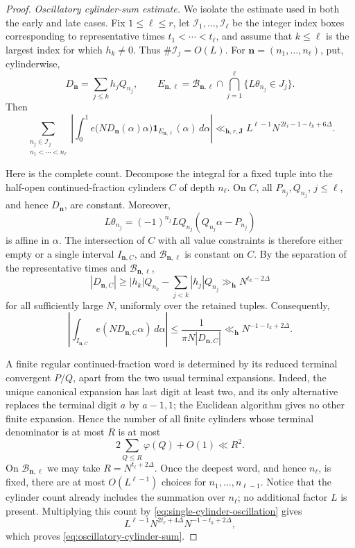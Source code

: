 \documentclass[11pt]{article}
\numberwithin{equation}{section}
\theoremstyle{definition}
\newcommand{\1}{\mathbf 1}
\begin{document}
\begin{proof}
\medskip
\noindent\emph{Oscillatory cylinder-sum estimate.}
We isolate the estimate used in both the early and late cases.  Fix
\(1\le\ell\le r\), let
\(\mathscr I_1,\ldots,\mathscr I_\ell\) be the integer index boxes
corresponding to representative times \(t_1<\cdots<t_\ell\), and
assume that \(k\le\ell\) is the largest index for which \(h_k\ne0\).
Thus \(\#\mathscr I_j=O(L)\).  For
\(\mathbf n=(n_1,\ldots,n_\ell)\), put, cylinderwise,
\[
 D_{\mathbf n}=\sum_{j\le k}h_jQ_{n_j},\qquad
 E_{\mathbf n,\ell}
 =\mathcal B_{\mathbf n,\ell}
  \cap\bigcap_{j=1}^{\ell}\{L\theta_{n_j}\in J_j\}.
\]
Then
\begin{equation}\label{eq:oscillatory-cylinder-sum}
 \sum_{\substack{n_j\in\mathscr I_j\\
                  n_1<\cdots<n_\ell}}
 \left|
  \int_0^1
   e\bigl(ND_{\mathbf n}(\alpha)\alpha\bigr)
   \1_{E_{\mathbf n,\ell}}(\alpha)\,d\alpha
 \right|
 \ll_{\mathbf h,r,\mathbf J}
 L^{\ell-1}N^{\,2t_\ell-1-t_k+6\Delta}.
\end{equation}

Here is the complete count.  Decompose the integral for a fixed tuple
into the half-open continued-fraction cylinders \(C\) of depth
\(n_\ell\).  On \(C\), all \(P_{n_j},Q_{n_j}\), \(j\le\ell\), and
hence \(D_{\mathbf n}\), are constant.  Moreover,
\[
 L\theta_{n_j}
 =(-1)^{n_j}LQ_{n_j}(Q_{n_j}\alpha-P_{n_j})
\]
is affine in \(\alpha\).  The intersection of \(C\) with all value
constraints is therefore either empty or a single interval
\(I_{\mathbf n,C}\), and
\(\mathcal B_{\mathbf n,\ell}\) is constant on \(C\).  By the
separation of the representative times and
\(\mathcal B_{\mathbf n,\ell}\),
\[
 |D_{\mathbf n,C}|
 \ge |h_k|Q_{n_k}-\sum_{j<k}|h_j|Q_{n_j}
 \gg_{\mathbf h}N^{t_k-2\Delta}
\]
for all sufficiently large \(N\), uniformly over the retained tuples.
Consequently,
\begin{equation}\label{eq:single-cylinder-oscillation}
 \left|
  \int_{I_{\mathbf n,C}}e(ND_{\mathbf n,C}\alpha)\,d\alpha
 \right|
 \le\frac1{\pi N|D_{\mathbf n,C}|}
 \ll_{\mathbf h}N^{-1-t_k+2\Delta}.
\end{equation}

A finite regular continued-fraction word is determined by its reduced
terminal convergent \(P/Q\), apart from the two usual terminal
expansions.  Indeed, the unique canonical expansion has last digit at
least two, and its only alternative replaces the terminal digit \(a\)
by \(a-1,1\); the Euclidean algorithm gives no other finite expansion.
Hence the number of all finite cylinders whose terminal
denominator is at most \(R\) is at most
\[
 2\sum_{Q\le R}\varphi(Q)+O(1)\ll R^2.
\]
On \(\mathcal B_{\mathbf n,\ell}\) we may take
\(R=N^{t_\ell+2\Delta}\).  Once the deepest word, and hence \(n_\ell\),
is fixed, there are at most \(O(L^{\ell-1})\) choices for
\(n_1,\ldots,n_{\ell-1}\).  Notice that the cylinder count already
includes the summation over \(n_\ell\); no additional factor \(L\) is
present.  Multiplying this count by
\eqref{eq:single-cylinder-oscillation} gives
\[
 L^{\ell-1}N^{2t_\ell+4\Delta}N^{-1-t_k+2\Delta},
\]
which proves \eqref{eq:oscillatory-cylinder-sum}.


\end{proof}
\end{document}
